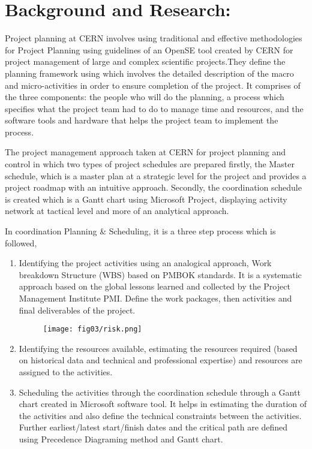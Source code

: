 \section{Background and Research: }

Project planning at CERN involves using traditional and effective methodologies for Project Planning using guidelines of an OpenSE tool created by CERN for project management of large and complex scientific projects.They define the planning framework using which involves the detailed description of the macro and micro-activities in order to ensure completion of the project. It comprises of the three components: the people who will do the planning, a process which specifies what the project team had to do to manage time and resources, and the software tools and hardware that helps the project team to implement the process.

The project management approach taken at CERN for project planning and control in which two types of project schedules are prepared firstly, the Master schedule, which is a master plan at a strategic level for the project and provides a project roadmap with an intuitive approach. Secondly, the coordination schedule is created which is a Gantt chart using Microsoft Project, displaying activity network at tactical level and more of an analytical approach.

In coordination Planning \& Scheduling, it is a three step process which is followed, 
\begin{enumerate}
	\item Identifying the project activities using an analogical approach, Work breakdown Structure (WBS) based on PMBOK standards. It is a systematic approach based on the global lessons learned and collected by the Project Management Institute PMI. Define the work packages, then activities and final deliverables of the project.
	
	\begin{figure}
		\centering
		\texttt{[image: fig03/risk.png]}
	\end{figure}

\item Identifying the resources available, estimating the resources required (based on historical data and technical and professional expertise) and resources are assigned to the activities. 

\item  Scheduling the activities through the coordination schedule through a Gantt chart created in Microsoft software tool. It helps in estimating the duration of the activities and also define the technical constraints between the activities. Further earliest/latest start/finish dates and the critical path are defined using Precedence Diagraming method and Gantt chart.

\end{enumerate}

